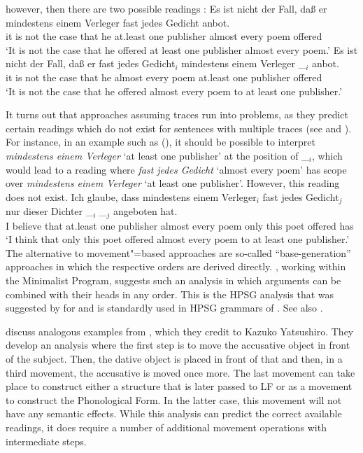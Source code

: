 \documentclass[output=paper
	        ,collection
	        ,collectionchapter
 	        ,biblatex
                ,babelshorthands
                ,newtxmath
                ,draftmode
                ,colorlinks, citecolor=brown
]{langscibook}
\begin{document}
however, then there are two possible readings \citep[]{Frey93a}:
\eal
\ex 
\gll Es ist nicht der Fall, daß er mindestens einem Verleger fast jedes Gedicht anbot.\\
     it is not the case that he at.least one publisher almost every poem offered\\
\glt `It is not the case that he offered at least one publisher almost every poem.'
\ex 
\gll Es ist nicht der Fall, daß er fast jedes Gedicht$_i$ mindestens einem Verleger \_$_i$ anbot.\\
	 it is not the case that he almost every poem at.least one publisher {} offered\\
\glt `It is not the case that he offered almost every poem to at least one publisher.'
\zl

\noindent
It turns out that approaches assuming traces run into problems, as they predict certain readings
which do not exist for\label{page-scrambling-scope}
sentences with multiple traces (see \citealp[]{Kiss2001a} and
\citealp[Section~2.6]{Fanselow2001a}). For instance, in an example such as (), it should be
possible to interpret \emph{mindestens einem Verleger} `at least one publisher' at the position of
\_$_i$, which would lead to a reading where \emph{fast jedes Gedicht} `almost every poem' has scope
over \emph{mindestens einem Verleger} `at least one publisher'. However, this reading does not exist.
\ea
\gll Ich glaube, dass mindestens einem Verleger$_i$ fast jedes Gedicht$_j$ nur dieser Dichter \_$_i$ \_$_j$ angeboten hat.\\
     I believe that at.least one publisher almost every poem only this poet {} {} offered has\\
\glt `I think that only this poet offered almost every poem to at least one publisher.'
\z
The alternative to movement"=based approaches are so-called ``base-generation'' approaches in which
the respective orders are derived directly. \citet{Fanselow2001a}, working within the Minimalist
Program, suggests such an analysis in which arguments can be combined with their heads in any
order. This is the HPSG analysis that was suggested by \citet{Gunji86a} for  and is
standardly used in HPSG grammars of 
\citep{HN94a,Kiss95a,Meurers99a,Mueller2003a,MuellerGS}. See also .

\citet[]{SE2002a} discuss analogous examples from , which they credit to
Kazuko Yatsushiro. They develop an analysis where the first step is to move
the accusative object in front of the subject. Then, the dative object is placed in front of that
and then, in a third movement, the accusative is moved once more. The last movement can take place
to construct either a structure that is later passed to LF or as a movement to construct the
Phonological Form. In the latter case, this movement will not have any semantic effects. While this
analysis can predict the correct available readings, it does require a number of additional movement
operations with intermediate steps.%
\end{document}
